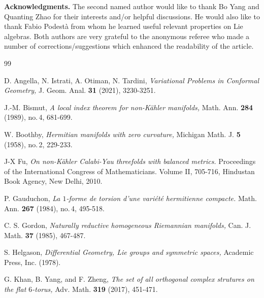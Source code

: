 \documentclass{amsart}
\newcommand{\vs}{\vspace{0.5cm}}
\begin{document}
{\vspace{0.3cm}





\vs

\noindent\textbf{Acknowledgments.} The second named author would like to thank Bo Yang and Quanting Zhao for their interests and/or helpful discussions. He would also like to thank Fabio Podest\`a from whom he learned useful relevant properties on Lie algebras. Both authors are very grateful to the anonymous referee who made a number of  corrections/suggestions  which enhanced the readability of the article.

\vs



\begin{thebibliography}{99}



  D. Angella, N. Istrati, A. Otiman, N. Tardini, \emph{Variational Problems in Conformal Geometry,}
J. Geom. Anal. {\bf  31} (2021), 3230-3251.




 J.-M. Bismut, \emph{A local index theorem for non-K\"ahler manifolds,}  Math. Ann. {\bf 284} (1989), no.\,4, 681-699.

 W. Boothby, \emph{Hermitian manifolds with zero curvature,} Michigan Math. J. {\bf 5} (1958), no.\,2, 229-233.



 J-X Fu,  {\em On non-K\"ahler Calabi-Yau threefolds with balanced metrics.} Proceedings of the International
Congress of Mathematicians. Volume II, 705-716, Hindustan Book Agency, New Delhi, 2010.

 P. Gauduchon, \emph{La $1$-forme de torsion d'une vari\'et\'e hermitienne compacte.} Math. Ann. {\bf 267} (1984), no.\,4, 495-518.



 C. S. Gordon, \emph{Naturally reductive homogeneous Riemannian manifolds,} Can. J. Math. \textbf{37} (1985), 467-487.


 S. Helgason, \emph{Differential Geometry, Lie groups and symmetric spaces,} Academic Press, Inc. (1978).



 G. Khan, B. Yang, and F. Zheng, \emph{The set of all orthogonal complex strutures on the flat $6$-torus,} Adv. Math. {\bf 319} (2017), 451-471.



\end{thebibliography}}
\end{document}
